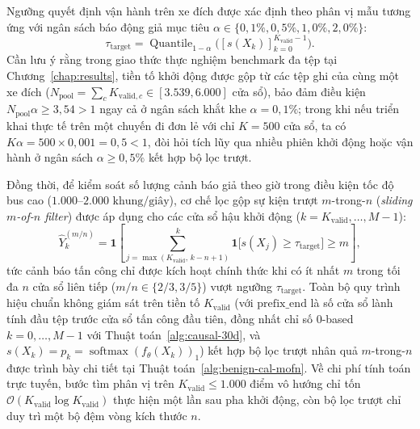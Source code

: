 \documentclass[12pt, a4paper, reqno, oneside]{book}
\begin{document}
Ngưỡng quyết định vận hành trên xe đích được xác định theo phân vị mẫu tương ứng với ngân sách báo động giả mục tiêu $\alpha \in \{0{,}1\%, 0{,}5\%, 1{,}0\%, 2{,}0\%\}$:
\begin{equation}
\tau_{\text{target}} = \operatorname{Quantile}_{1-\alpha}\big([s(X_k)]_{k=0}^{K_{\text{valid}}-1}\big).
\end{equation}
Cần lưu ý rằng trong giao thức thực nghiệm benchmark đa tệp tại Chương~\ref{chap:results}, tiền tố khởi động được gộp từ các tệp ghi của cùng một xe đích ($N_{\text{pool}} = \sum_{c} K_{\text{valid}, c} \in [3.539, 6.000]$ cửa sổ), bảo đảm điều kiện $N_{\text{pool}}\alpha \ge 3{,}54 > 1$ ngay cả ở ngân sách khắt khe $\alpha=0{,}1\%$; trong khi nếu triển khai thực tế trên một chuyến đi đơn lẻ với chỉ $K=500$ cửa sổ, ta có $K\alpha = 500 \times 0{,}001 = 0{,}5 < 1$, đòi hỏi tích lũy qua nhiều phiên khởi động hoặc vận hành ở ngân sách $\alpha \ge 0{,}5\%$ kết hợp bộ lọc trượt.

Đồng thời, để kiểm soát số lượng cảnh báo giả theo giờ trong điều kiện tốc độ bus cao ($1.000\text{--}2.000\text{ khung/giây}$), cơ chế lọc gộp sự kiện trượt $m$-trong-$n$ (\textit{sliding $m$-of-$n$ filter}) được áp dụng cho các cửa sổ hậu khởi động ($k = K_{\mathrm{valid}}, \ldots, M - 1$):
\begin{equation}\label{eq:mofn-filter}
\widehat{Y}_k^{(m/n)} = \mathbf{1}\!\left[\sum_{j=\max(K_{\mathrm{valid}},\, k-n+1)}^{k} \mathbf{1}\big[s(X_j) \ge \tau_{\mathrm{target}}\big] \ge m\right],
\end{equation}
tức cảnh báo tấn công chỉ được kích hoạt chính thức khi có ít nhất $m$ trong tối đa $n$ cửa sổ liên tiếp ($m/n \in \{2/3, 3/5\}$) vượt ngưỡng $\tau_{\mathrm{target}}$. Toàn bộ quy trình hiệu chuẩn không giám sát trên tiền tố $K_{\mathrm{valid}}$ (với $\mathrm{prefix\_end}$ là số cửa sổ lành tính đầu tệp trước cửa sổ tấn công đầu tiên, đồng nhất chỉ số 0-based $k=0,\ldots,M-1$ với Thuật toán~\ref{alg:causal-30d}, và $s(X_k) = p_k = \operatorname{softmax}(f_\theta(X_k))_1$) kết hợp bộ lọc trượt nhân quả $m$-trong-$n$ được trình bày chi tiết tại Thuật toán~\ref{alg:benign-cal-mofn}. Về chi phí tính toán trực tuyến, bước tìm phân vị trên $K_{\mathrm{valid}} \le 1.000$ điểm vô hướng chỉ tốn $\mathcal{O}(K_{\mathrm{valid}}\log K_{\mathrm{valid}})$ thực hiện một lần sau pha khởi động, còn bộ lọc trượt chỉ duy trì một bộ đệm vòng kích thước $n$.
\end{document}
